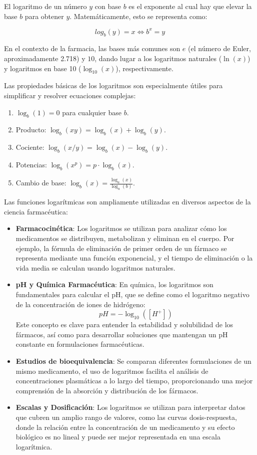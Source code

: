 \documentclass[
  spanish,
  letterpaper,
  DIV=11,
  numbers=noendperiod]{scrreprt}
\begin{document}
El logaritmo de un número \(y\) con base \(b\) es el exponente al cual
hay que elevar la base \(b\) para obtener \(y\). Matemáticamente, esto
se representa como:

\[log_b(y) = x \Leftrightarrow b^x = y\]

En el contexto de la farmacia, las bases más comunes son \(e\) (el
número de Euler, aproximadamente 2.718) y \(10\), dando lugar a los
logaritmos naturales (\(\ln(x)\)) y logaritmos en base 10
(\(\log_{10}(x)\)), respectivamente.

Las propiedades básicas de los logaritmos son especialmente útiles para
simplificar y resolver ecuaciones complejas:

\begin{enumerate}
\def\labelenumi{\alph{enumi}.}
\item
  \(\log_b(1) = 0\) para cualquier base \(b\).
\item
  Producto: \(\log_b(xy) = \log_b(x) + \log_b(y)\).
\item
  Cociente: \(\log_b(x/y) = \log_b(x) - \log_b(y)\).
\item
  Potencias: \(\log_b(x^p) = p \cdot \log_b(x)\).
\item
  Cambio de base: \(\log_b(x) = \frac{\log_a(x)}{\log_a(b)}\).
\end{enumerate}

Las funciones logarítmicas son ampliamente utilizadas en diversos
aspectos de la ciencia farmacéutica:

\begin{itemize}
\item
  \textbf{Farmacocinética}: Los logaritmos se utilizan para analizar
  cómo los medicamentos se distribuyen, metabolizan y eliminan en el
  cuerpo. Por ejemplo, la fórmula de eliminación de primer orden de un
  fármaco se representa mediante una función exponencial, y el tiempo de
  eliminación o la vida media se calculan usando logaritmos naturales.
\item
  \textbf{pH y Química Farmacéutica}: En química, los logaritmos son
  fundamentales para calcular el pH, que se define como el logaritmo
  negativo de la concentración de iones de hidrógeno:
  \[pH = -\log_{10}([H^+])\] Este concepto es clave para entender la
  estabilidad y solubilidad de los fármacos, así como para desarrollar
  soluciones que mantengan un pH constante en formulaciones
  farmacéuticas.
\item
  \textbf{Estudios de bioequivalencia}: Se comparan diferentes
  formulaciones de un mismo medicamento, el uso de logaritmos facilita
  el análisis de concentraciones plasmáticas a lo largo del tiempo,
  proporcionando una mejor comprensión de la absorción y distribución de
  los fármacos.
\item
  \textbf{Escalas y Dosificación}: Los logaritmos se utilizan para
  interpretar datos que cubren un amplio rango de valores, como las
  curvas dosis-respuesta, donde la relación entre la concentración de un
  medicamento y su efecto biológico es no lineal y puede ser mejor
  representada en una escala logarítmica.
\end{itemize}
\end{document}
